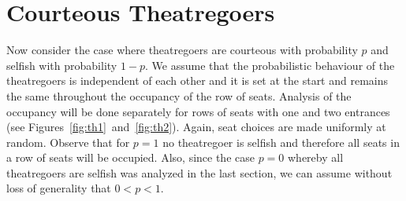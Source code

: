 \documentclass[11pt]{llncs}
\begin{document}
\section{Courteous Theatregoers}
\label{courteous:sec}

Now consider the case where theatregoers are 
courteous with probability $p$ and
selfish with
probability $1-p$. 
We assume that the probabilistic behaviour of
the theatregoers is independent of each other and
it is set at the start and remains the same throughout
the occupancy of the row of seats. Analysis
of the occupancy will be done separately
for rows of seats with one and two entrances
(see Figures~\ref{fig:th1}~and~\ref{fig:th2}). Again, 
seat choices are made uniformly at random. 
Observe that
for $p=1$ no theatregoer is selfish and therefore all
seats in a row of seats will be occupied.
Also, since
the case $p=0$ whereby all theatregoers are selfish
was analyzed in the last section, we can assume without
loss of generality
that $0 < p < 1$.
\end{document}
